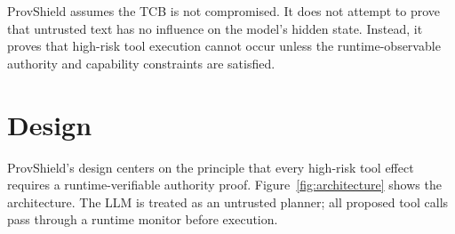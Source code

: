 \documentclass[sigconf,anonymous,review]{acmart}
\begin{document}
ProvShield assumes the TCB is not compromised. It does not attempt to prove that untrusted text has no influence on the model's hidden state. Instead, it proves that high-risk tool execution cannot occur unless the runtime-observable authority and capability constraints are satisfied.

\section{Design}
\label{sec:design}

ProvShield's design centers on the principle that every high-risk tool effect requires a runtime-verifiable authority proof. Figure~\ref{fig:architecture} shows the architecture. The LLM is treated as an untrusted planner; all proposed tool calls pass through a runtime monitor before execution.
\end{document}
